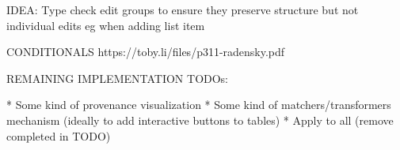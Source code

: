 \documentclass[sigconf]{acmart}
\begin{document}
IDEA: Type check edit groups to ensure they preserve structure but not individual edits eg when adding list item

CONDITIONALS
https://toby.li/files/p311-radensky.pdf


REMAINING IMPLEMENTATION TODOs:

* Some kind of provenance visualization
* Some kind of matchers/transformers mechanism (ideally to add interactive buttons to tables)
* Apply to all (remove completed in TODO)

\newpage
~



\end{document}
